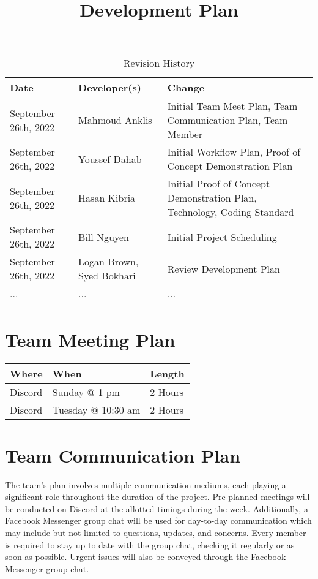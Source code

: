 \documentclass[12pt,letterpaper]{article}
\title{Development Plan\\\progname}
\author{\authname}
\date{}
\begin{document}
\begin{table}[hp]
	\caption{Revision History} \label{TblRevisionHistory}
	\begin{tabularx}{\textwidth}{llX}
		\toprule
		\textbf{Date} & \textbf{Developer(s)} & \textbf{Change}\\
		\midrule
		September 26th, 2022 & Mahmoud Anklis  & Initial Team Meet Plan, Team Communication Plan, Team Member\\
		September 26th, 2022 & Youssef Dahab  & Initial Workflow Plan, Proof of Concept Demonstration Plan \\
		September 26th, 2022 & Hasan Kibria  & Initial Proof of Concept Demonstration Plan, Technology, Coding Standard \\
		September 26th, 2022 & Bill Nguyen  & Initial Project Scheduling \\
		September 26th, 2022 & Logan Brown, Syed Bokhari & Review Development Plan\\
		... & ... & ...\\
		\bottomrule
	\end{tabularx}
\end{table}

\newpage

\maketitle


\section{Team Meeting Plan}
\begin{table}[hp]
\begin{tabularx}{\textwidth}{|l|l|X|}
\toprule
\textbf{Where} & \textbf{When} & \textbf{Length}\\
\midrule
Discord & Sunday @ 1 pm & 2 Hours\\
Discord & Tuesday @ 10:30 am & 2 Hours\\
\bottomrule
\end{tabularx}
\end{table}

\section{Team Communication Plan}
The team’s plan involves multiple communication mediums, each playing a significant role throughout the duration of the project. Pre-planned meetings will be conducted on Discord at the allotted timings during the week. Additionally, a Facebook Messenger group chat will be used for day-to-day communication which may include but not limited to questions, updates, and concerns. Every member is required to stay up to date with the group chat, checking it regularly or as soon as possible. Urgent issues will also be conveyed through the Facebook Messenger group chat. 
\end{document}
